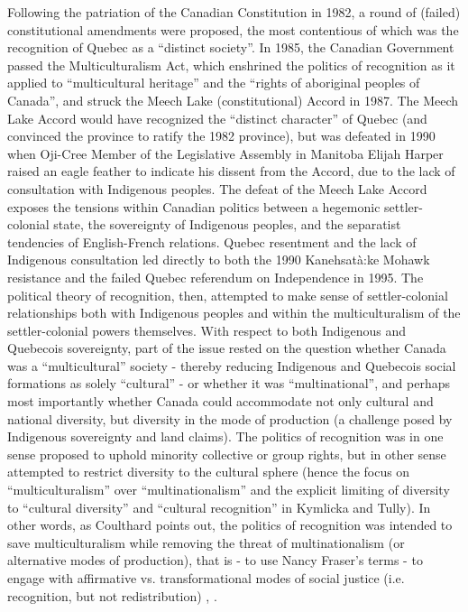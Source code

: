 \documentclass[12pt,oneside]{memoir}
\begin{document}
Following the patriation of the Canadian Constitution in 1982, a round of (failed) constitutional amendments were proposed, the most contentious of which was the recognition of Quebec as a ``distinct society''. In 1985, the Canadian Government passed the Multiculturalism Act, which enshrined the politics of recognition as it applied to ``multicultural heritage'' and the ``rights of aboriginal peoples of Canada'', and struck the Meech Lake (constitutional) Accord in 1987. The Meech Lake Accord would have recognized the ``distinct character'' of Quebec (and convinced the province to ratify the 1982 province), but was defeated in 1990 when Oji-Cree Member of the Legislative Assembly in Manitoba Elijah Harper raised an eagle feather to indicate his dissent from the Accord, due to the lack of consultation with Indigenous peoples. The defeat of the Meech Lake Accord exposes the tensions within Canadian politics between a hegemonic settler-colonial state, the sovereignty of Indigenous peoples, and the separatist tendencies of English-French relations. Quebec resentment and the lack of Indigenous consultation led directly to both the 1990 Kanehsatà:ke Mohawk resistance and the failed Quebec referendum on Independence in 1995. The political theory of recognition, then, attempted to make sense of settler-colonial relationships both with Indigenous peoples and within the multiculturalism of the settler-colonial powers themselves. With respect to both Indigenous and Quebecois sovereignty, part of the issue rested on the question whether Canada was a ``multicultural'' society - thereby reducing Indigenous and Quebecois social formations as solely ``cultural'' - or whether it was ``multinational'', and perhaps most importantly whether Canada could accommodate not only cultural and national diversity, but diversity in the mode of production (a challenge posed by Indigenous sovereignty and land claims). The politics of recognition was in one sense proposed to uphold minority collective or group rights, but in other sense attempted to restrict diversity to the cultural sphere (hence the focus on ``multiculturalism'' over ``multinationalism'' and the explicit limiting of diversity to ``cultural diversity'' and ``cultural recognition'' in Kymlicka and Tully). In other words, as Coulthard points out, the politics of recognition was intended to save multiculturalism while removing the threat of multinationalism (or alternative modes of production), that is - to use Nancy Fraser's terms - to engage with affirmative vs. transformational modes of social justice (i.e. recognition, but not redistribution) \citep[35-36]{coulthard2014}, \citep[74]{fraser-honneth}.
\end{document}
